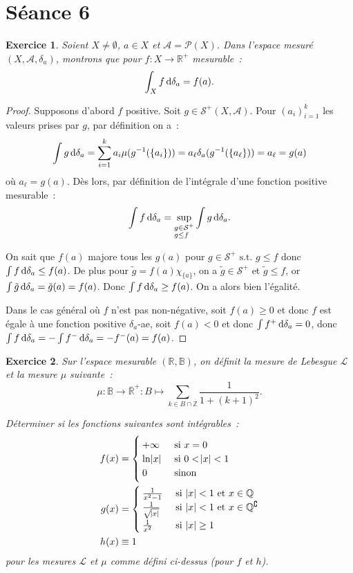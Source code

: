 \documentclass{article}
\newtheorem{ex}{Exercice}[section]
\newcommand{\pinfty}{{+\infty}}
\newcommand{\st}{\text{ s.t. }}
\newcommand{\C}{\complement}
\newcommand{\Z}{{\mathbb Z}}
\newcommand{\Q}{{\mathbb Q}}
\newcommand{\R}{{\mathbb R}}
\newcommand{\B}{{\mathbb B}}
\begin{document}
\newpage
\section{Séance 6}

\begin{ex} Soient $X \neq \emptyset$, $a \in X$ et $\mathcal A = \mathcal P(X)$. Dans l'espace mesuré $(X, \mathcal A, \delta_a)$, montrons que pour $f : X \to \R^+$ mesurable~:
\[\int_X f\dif\delta_a = f(a).\]
\end{ex}

\begin{proof} Supposons d'abord $f$ positive. Soit $g \in \mathcal S^+(X, \mathcal A)$. Pour $(a_i)_{i=1}^k$ les valeurs prises par $g$, par définition on a~:
\[\int g\dif\delta_a = \sum_{i=1}^ka_i\mu(g^{-1}(\{a_i\})) = a_\ell\delta_a(g^{-1}(\{a_\ell\})) = a_\ell = g(a)\]
où $a_\ell = g(a)$. Dès lors, par définition de l'intégrale d'une fonction positive mesurable~:
\[\int f\dif\delta_a = \sup_{\begin{subarray}{l} g \in \mathcal S^+ \\ g \leq f \end{subarray}}\int g\dif\delta_a.\]

On sait que $f(a)$ majore tous les $g(a)$ pour $g \in \mathcal S^+ \st g \leq f$ donc $\int f\dif\delta_a \leq f(a)$. De plus pour $\tilde g = f(a)\chi_{\{a\}}$, on a
$\tilde g \in \mathcal S^+$ et $\tilde g \leq f$, or $\int \tilde g\dif\delta_a = \tilde g(a) = f(a)$. Donc $\int f\dif\delta_a \geq f(a)$. On a alors bien l'égalité.

Dans le cas général où $f$ n'est pas non-négative, soit $f(a) \geq 0$ et donc $f$ est égale à une fonction positive $\delta_a$-ae, soit $f(a) < 0$ et donc $\int f^+\dif\delta_a = 0$,
donc $\int f\dif\delta_a = -\int f^-\dif\delta_a = -f^-(a) = f(a)$.
\end{proof}

\begin{ex} Sur l'espace mesurable $(\R, \B)$, on définit la mesure de Lebesgue $\mathcal L$ et la mesure $\mu$ suivante~:
\[\mu : \B \to \overline \R^+ : B \mapsto \sum_{k \in B \cap \Z}\frac 1{1 + (k+1)^2}.\]

Déterminer si les fonctions suivantes sont intégrables~:
\begin{align*}
	f(x) &=
	\begin{cases}
		\pinfty &\text{ si } x=0 \\
		\ln\abs x & \text{ si } 0 < \abs x < 1 \\
		0 &\text{ sinon}
	\end{cases} \\
	g(x) &=
	\begin{cases}
		\frac 1{x^2-1} &\text{ si } \abs x < 1 \text{ et } x \in \Q \\
		\frac 1{\sqrt {\abs x}} &\text{ si } \abs x < 1 \text{ et } x \in \Q^\C\\
		\frac 1{x^2} & \text{ si }\abs x \geq 1
	\end{cases} \\
	h(x) &\equiv 1
\end{align*}
pour les mesures $\mathcal L$ et $\mu$ comme défini ci-dessus (pour $f$ et $h$).
\end{ex}
\end{document}
